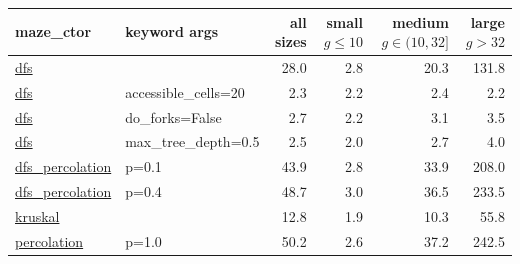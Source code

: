 \documentclass[10pt,a4paper,onecolumn]{article}
\begin{document}
\begin{table}[H]
\centering
\begin{tabular}{|ll|r|rrr|}
  \hline
  maze\_ctor
          & keyword args           & all sizes 
                                              & \shortstack{small \\ $g \leq 10$} 
                                                         & \shortstack{medium \\ $g \in (10, 32]$} 
                                                                    & \shortstack{large \\ $g > 32$} \\
  \hline\hline
  \href{https://understanding-search.github.io/maze-dataset/maze_dataset.html\#LatticeMazeGenerators.gen_dfs}{dfs}
          &                        &   28.0   &    2.8   &   20.3   &  131.8   \\
  \href{https://understanding-search.github.io/maze-dataset/maze_dataset.html\#LatticeMazeGenerators.gen_dfs}{dfs}
          & accessible\_cells=20   &    2.3   &    2.2   &    2.4   &    2.2   \\
  \href{https://understanding-search.github.io/maze-dataset/maze_dataset.html\#LatticeMazeGenerators.gen_dfs}{dfs}
          & do\_forks=False        &    2.7   &    2.2   &    3.1   &    3.5   \\
  \href{https://understanding-search.github.io/maze-dataset/maze_dataset.html\#LatticeMazeGenerators.gen_dfs}{dfs}
          & max\_tree\_depth=0.5   &    2.5   &    2.0   &    2.7   &    4.0   \\
  \href{https://understanding-search.github.io/maze-dataset/maze_dataset.html\#LatticeMazeGenerators.gen_dfs_percolation}{dfs\_percolation}
          & p=0.1                  &   43.9   &    2.8   &   33.9   &  208.0   \\
  \href{https://understanding-search.github.io/maze-dataset/maze_dataset.html\#LatticeMazeGenerators.gen_dfs_percolation}{dfs\_percolation}
          & p=0.4                  &   48.7   &    3.0   &   36.5   &  233.5   \\
  \href{https://understanding-search.github.io/maze-dataset/maze_dataset.html\#LatticeMazeGenerators.gen_kruskal}{kruskal}
          &                        &   12.8   &    1.9   &   10.3   &   55.8   \\
  \href{https://understanding-search.github.io/maze-dataset/maze_dataset.html\#LatticeMazeGenerators.gen_percolation}{percolation}
          & p=1.0                  &   50.2   &    2.6   &   37.2   &  242.5   \\

\end{tabular}
\end{table}
\end{document}
